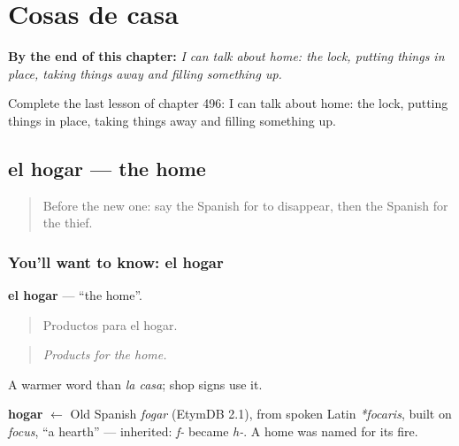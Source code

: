 
\chapter{Cosas de casa}
\label{ch:es-cosas-de-casa}

\begin{chapteropening}
\textbf{By the end of this chapter:} \emph{I can talk about home: the lock, putting things in place, taking things away and filling something up.}

Complete the last lesson of chapter 496: I can talk about home: the lock, putting things in place, taking things away and filling something up.
\end{chapteropening}

\section[el hogar]{el hogar — the home}

\label{lesson:ES-C496-hogar}



\begin{quote}
Before the new one: say the Spanish for to disappear, then the Spanish for the thief.
\end{quote}

\subsection*{You'll want to know: el hogar}
\textbf{el hogar} — \textquotedblleft{}the home\textquotedblright{}.

\begin{quote}
Productos para el hogar.
\end{quote}

\begin{quote}
\emph{Products for the home.}
\end{quote}

A warmer word than \emph{la casa}; shop signs use it.

\begin{cousinweb}
\textbf{hogar} $\leftarrow$ Old Spanish \emph{fogar} (EtymDB 2.1), from spoken Latin \emph{*focaris}, built on \emph{focus}, \textquotedblleft{}a hearth\textquotedblright{} — inherited: \emph{f-} became \emph{h-}. A home was named for its fire.
\end{cousinweb}

